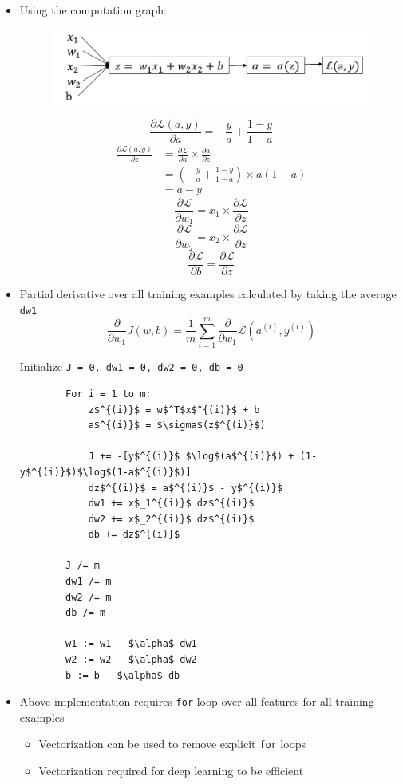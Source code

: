 \documentclass[12pt, letterpaper]{article}
\begin{document}
    \begin{itemize}
        \item Using the computation graph:
        \begin{figure}[ht]
            \centering
            \includegraphics[width=12cm]{6.png}
        \end{figure}
        \begin{center}
            $$\frac{\partial \mathcal{L}(a,y)}{\partial a}=-\frac{y}{a}+\frac{1-y}{1-a}$$
            \begin{align*}
                \frac{\partial\mathcal{L}(a,y)}{\partial z} &=\frac{\partial\mathcal{L}}{\partial a} \times \frac{\partial a}{\partial z} \\
                &= (-\frac{y}{a}+\frac{1-y}{1-a}) \times a(1-a) \\
                &= a-y
            \end{align*}
            $$\frac{\partial\mathcal{L}}{\partial w_1}=x_1 \times \frac{\partial\mathcal{L}}{\partial z}$$
            $$\frac{\partial\mathcal{L}}{\partial w_2}=x_2 \times \frac{\partial\mathcal{L}}{\partial z}$$
            $$\frac{\partial\mathcal{L}}{\partial b}=\frac{\partial\mathcal{L}}{\partial z}$$
        \end{center}
        \item Partial derivative over all training examples calculated by taking the average \texttt{dw1}
        $$\frac{\partial}{\partial w_1}J(w,b)=\frac{1}{m}\sum^m_{i=1}\frac{\partial}{\partial w_1} \mathcal{L}(a^{(i)},y^{(i)})$$

        Initialize \texttt{J = 0, dw1 = 0, dw2 = 0, db = 0}
        \begin{lstlisting}
        For i = 1 to m:
            z$^{(i)}$ = w$^T$x$^{(i)}$ + b
            a$^{(i)}$ = $\sigma$(z$^{(i)}$)

            J += -[y$^{(i)}$ $\log$(a$^{(i)}$) + (1-y$^{(i)}$)$\log$(1-a$^{(i)}$)]
            dz$^{(i)}$ = a$^{(i)}$ - y$^{(i)}$
            dw1 += x$_1^{(i)}$ dz$^{(i)}$
            dw2 += x$_2^{(i)}$ dz$^{(i)}$
            db += dz$^{(i)}$

        J /= m
        dw1 /= m
        dw2 /= m
        db /= m

        w1 := w1 - $\alpha$ dw1
        w2 := w2 - $\alpha$ dw2 
        b := b - $\alpha$ db
        \end{lstlisting}
        \item Above implementation requires \texttt{for} loop over all features for all training examples
        \begin{itemize}
            \item Vectorization can be used to remove explicit \texttt{for} loops
            \item Vectorization required for deep learning to be efficient
        \end{itemize}
    \end{itemize}
\end{document}
